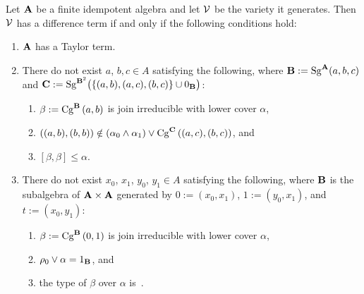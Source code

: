\begin{theorem}\label{thm:algorithm}
Let $\alg A$ be a finite idempotent algebra and let $\sV$ be the variety 
it generates. Then $\sV$ has a difference term if and only if the
following conditions hold:
\begin{enumerate}
\item $\alg A$ has a Taylor term.
\item There do not exist $a$, $b, c\in A$
satisfying the following, where 
$\alg B := \Sg^{\alg A}(a, b, c)$ 
and
$\alg C:=\Sg^{\alg{B}^2}\bigl(\{(a,b), (a,c), (b, c)\} 
                    \cup 0_{\alg B}\bigr)$:
\begin{enumerate}
\item $\beta := \Cga a b B$ is join irreducible with lower cover $\alpha$,
\item $((a,b),(b,b)) \notin (\alpha_0 \meet \alpha_1) \join \Cga {(a,c)} {(b,c)} C$,  and
\item $[\beta,\beta] \le \alpha$.
\end{enumerate}

\item There do not exist $x_0$, $x_1$, $y_0$, $y_1\in A$ satisfying
the following, where 
$\alg B$ is the subalgebra of 
$\alg A \times \alg A$ generated by $0 := (x_0, x_1)$, $1 := (y_0,x_1)$, 
and $t := (x_0,y_1)$: 
\begin{enumerate}
\item $\beta := \Cga01{B}$ is join irreducible with lower cover $\alpha$,
\item $\rho_0 \join \alpha = 1_{\alg B}$, and
\item the type of $\beta$ over  $\alpha$ is~\atyp.
\end{enumerate}
\end{enumerate}
\end{theorem}

